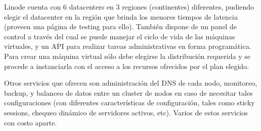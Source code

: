 Linode cuenta con 6 datacenters en 3 regiones (continentes) diferentes, pudiendo elegir el datacenter en la región que brinda los menores tiempos de latencia (proveen una página de testing para ello). También dispone de un panel de control a través del cual se puede manejar el ciclo de vida de las máquinas virtuales, y un API para realizar tareas administrativas en forma programática. Para crear una máquina virtual sólo debe elegirse la distribución requerida y se procede a instanciarla con el acceso a los recursos ofrecidos por el plan elegido.

Otros servicios que ofrecen son administración del DNS de cada nodo, monitoreo, backup, y balanceo de datos entre un cluster de nodos en caso de necesitar tales configuraciones (con diferentes características de configuración, tales como sticky sessions, chequeo dinámico de servidores activos, etc). Varios de estos servicios con costo aparte.
